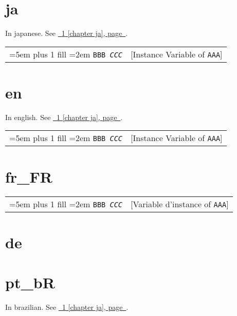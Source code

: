 \documentclass{book}
\begin{document}
\label{anchor:Top}%
%
\chapter{{ja}}
\label{anchor:chapter-ja}%

In japanese. See \hyperref[anchor:chapter-ja]{\chaptername~\ref*{anchor:chapter-ja} [chapter ja], page~\pageref*{anchor:chapter-ja}}.

\noindent\begin{tabularx}{\linewidth}{@{}Xr}
\rightskip=5em plus 1 fill
\hangindent=2em
\texttt{BBB \EmbracOn{}\textnormal{\textsl{CCC}}\EmbracOff{}}& [Instance Variable of \texttt{AAA}]
\end{tabularx}

%

%
\chapter{{en}}
\label{anchor:chapter-en}%

In english. See \hyperref[anchor:chapter-ja]{\chaptername~\ref*{anchor:chapter-ja} [chapter ja], page~\pageref*{anchor:chapter-ja}}.

\noindent\begin{tabularx}{\linewidth}{@{}Xr}
\rightskip=5em plus 1 fill
\hangindent=2em
\texttt{BBB \EmbracOn{}\textnormal{\textsl{CCC}}\EmbracOff{}}& [Instance Variable of \texttt{AAA}]
\end{tabularx}

%

%
\chapter{{fr\_FR}}
\label{anchor:chapter-fr_005fFR}%


\noindent\begin{tabularx}{\linewidth}{@{}Xr}
\rightskip=5em plus 1 fill
\hangindent=2em
\texttt{BBB \EmbracOn{}\textnormal{\textsl{CCC}}\EmbracOff{}}& [Variable d'instance of \texttt{AAA}]
\end{tabularx}

%

%
\chapter{{de}}
\label{anchor:chapter-de}%

%
\chapter{{pt\_bR}}
\label{anchor:chapter-pt_005fBR}%

In brazilian. See \hyperref[anchor:chapter-ja]{\chaptername~\ref*{anchor:chapter-ja} [chapter ja], page~\pageref*{anchor:chapter-ja}}.
\end{document}
